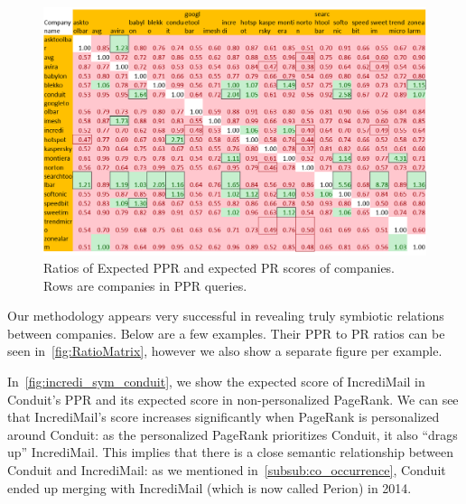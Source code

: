 \documentclass[ijoc,nonblindrev]{informs3} %
\numberwithin{equation}{subsection}
\begin{document}
\begin{figure}[!htbp]
\centering
    \includegraphics[scale=0.8]{figures/RatioMatrixPortrate.png}
    \caption{Ratios of Expected PPR and expected PR scores of companies. Rows are companies in PPR queries.}
    \label{fig:RatioMatrix}
\end{figure}

Our methodology appears very successful in revealing truly symbiotic relations between companies. Below are a few examples. Their PPR to PR ratios can be seen in~\autoref{fig:RatioMatrix}, however we also show a separate figure per example.

In~\autoref{fig:incredi_sym_conduit}, we show the expected score of IncrediMail in Conduit's PPR and its expected score in non-personalized PageRank. We can see that IncrediMail's score increases significantly when PageRank is personalized around Conduit: as the personalized PageRank prioritizes Conduit, it also ``drags up'' IncrediMail. This implies that there is a close semantic relationship between Conduit and IncrediMail: as we mentioned in~\autoref{subsub:co_occurrence}, Conduit ended up merging with IncrediMail (which is now called Perion) in 2014. 
\end{document}
